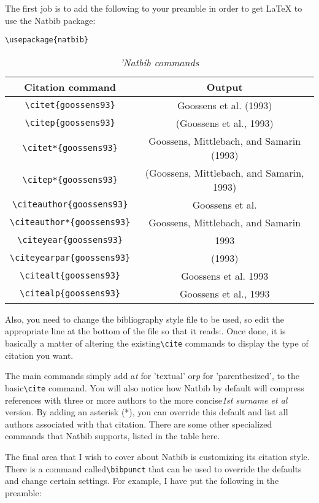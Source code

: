 The first job is to add the following to your preamble in order to get LaTeX to
use the Natbib package:

\begin{lstlisting}
\usepackage{natbib}
\end{lstlisting}

\begin{table}
\caption{\textit{'Natbib commands}}
\begin{tabular}{c c} \hline
 Citation command
&  Output
\\ \hline
 \verb|\citet{goossens93}|
&  Goossens et al. (1993)
\\ \hline
\verb|\citep{goossens93}|
&  (Goossens et al., 1993)
\\ \hline
 \verb|\citet*{goossens93}|
&  Goossens, Mittlebach, and Samarin (1993)
\\ \hline
 \verb|\citep*{goossens93}|
&  (Goossens, Mittlebach, and Samarin, 1993)
\\ \hline
 \verb|\citeauthor{goossens93}|
&  Goossens et al.
\\ \hline
 \verb|\citeauthor*{goossens93}|
&  Goossens, Mittlebach, and Samarin
\\ \hline
 \verb|\citeyear{goossens93}|
&  1993
\\ \hline
 \verb|\citeyearpar{goossens93}|
&  (1993)
\\ \hline
 \verb|\citealt{goossens93}|
&  Goossens et al. 1993
\\ \hline
 \verb|\citealp{goossens93}|
&  Goossens et al., 1993
\end{tabular}
\end{table}

Also, you need to change the bibliography style file to be used, so edit the
appropriate line at the bottom of the file so that it
reads:\verb||. Once done, it is basically a matter
of altering the existing\verb|\cite| commands to display the type of citation
you want.

The main commands simply add a\textit{t} for 'textual' or\textit{p} for
'parenthesized', to the basic\verb|\cite| command. You will also notice how
Natbib by default will compress references with three or more authors to the
more concise\textit{1st surname et al} version. By adding an asterisk (*), you
can override this default and list all authors associated with that citation.
There are some other specialized commands that Natbib supports, listed in the
table here.

The final area that I wish to cover about Natbib is customizing its citation
style. There is a command called\verb|\bibpunct| that can be used to override
the defaults and change certain settings. For example, I have put the following
in the preamble:

